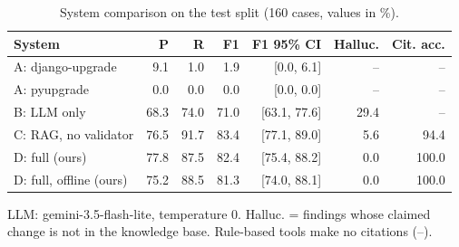 \begin{table}[t]
\centering
\footnotesize
\setlength{\tabcolsep}{4pt}
\caption{System comparison on the test split (160 cases, values in \%).}
\label{tab:comparison-test}
\begin{tabular}{lrrrrrr}
\toprule
System & P & R & F1 & F1 95\% CI & Halluc. & Cit. acc. \\
\midrule
A: django-upgrade & 9.1 & 1.0 & 1.9 & [0.0, 6.1] & -- & -- \\
A: pyupgrade & 0.0 & 0.0 & 0.0 & [0.0, 0.0] & -- & -- \\
B: LLM only & 68.3 & 74.0 & 71.0 & [63.1, 77.6] & 29.4 & -- \\
C: RAG, no validator & 76.5 & 91.7 & 83.4 & [77.1, 89.0] & 5.6 & 94.4 \\
D: full (ours) & 77.8 & 87.5 & 82.4 & [75.4, 88.2] & 0.0 & 100.0 \\
D: full, offline (ours) & 75.2 & 88.5 & 81.3 & [74.0, 88.1] & 0.0 & 100.0 \\
\bottomrule
\end{tabular}
\par\vspace{2pt}\parbox{\linewidth}{\scriptsize LLM: gemini-3.5-flash-lite, temperature 0. Halluc. = findings whose claimed change is not in the knowledge base. Rule-based tools make no citations (--).}
\end{table}
